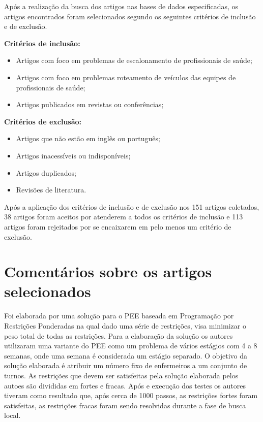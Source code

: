 Após a realização da busca dos artigos nas bases de dados especificadas, os artigos encontrados foram selecionados segundo os seguintes critérios de inclusão e de exclusão.

\textbf{Critérios de inclusão:}
\begin{itemize}
\item Artigos com foco em problemas de escalonamento de profissionais de saúde;
\item Artigos com foco em problemas roteamento de veículos das equipes de profissionais de saúde;
\item Artigos publicados em revistas ou conferências;

\end{itemize}

\textbf{Critérios de exclusão:}
\begin{itemize}
\item Artigos que não estão em inglês ou português;
\item Artigos inacessíveis ou indisponíveis;
\item Artigos duplicados;
\item Revisões de literatura.
\end{itemize}

Após a aplicação dos critérios de inclusão e de exclusão nos 151 artigos coletados, 38 artigos foram aceitos por atenderem a todos os critérios de inclusão e 113 artigos foram rejeitados por se encaixarem em pelo menos um critério de exclusão. %


\section{Comentários sobre os artigos selecionados}

Foi elaborada por \cite{santos:2015} uma solução para o \ac{PEE} baseada em Programação por Restrições Ponderadas na qual dado uma série de restrições, visa minimizar o peso total de todas as restrições. Para a elaboração da solução os autores utilizaram uma variante do \ac{PEE} como um problema de vários estágios com 4 a 8 semanas, onde uma semana é considerada um estágio separado. O objetivo da solução elaborada é atribuir um número fixo de enfermeiros a um conjunto de turnos. As restrições que devem ser satisfeitas pela solução elaborada pelos autoes são divididas em fortes e fracas. Após e execução dos testes os autores tiveram como resultado que, após cerca de 1000 passos, as restrições fortes foram satisfeitas, as restrições fracas foram sendo resolvidas durante a fase de busca local.

